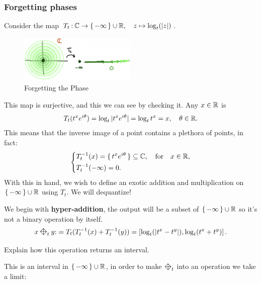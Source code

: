 \documentclass[12pt]{memoir}
\newcommand{\diamondplus}{\mathbin{\rotatebox[origin=c]{45}{$\boxtimes$}}} %
\begin{document}
\subsubsection{Forgetting phases}

Consider the map $T_t\mathbin{:}\mathbb{C}\to\{\,-\infty\,\}\cup\mathbb{R},\quad z\mapsto\log_t(|z|)$.
\begin{figure}[h!]
    \centering
    \includegraphics[width=0.5\textwidth]{figs/fig3-2-PhaseForgetting.png}
    \caption{Forgetting the Phase}
    \label{fig:3-2-PhaseForgetting}
\end{figure}
This map is surjective, and this we can see by checking it. Any $x\in\mathbb{R}$ is 
$$T_t(t^xe^{i\theta})=\log_t|t^xe^{i\theta}|=\log_tt^x=x,\quad\theta\in\mathbb{R}.$$
This means that the inverse image of a point contains a plethora of points, in fact:
$$
\left\lbrace
\begin{aligned}
    &T_t^{-1}(x)=\{\,t^xe^{i\theta}\,\}\subseteq\mathbb{C},\quad\text{for}\quad x\in\mathbb{R},\\
    &T_t^{-1}(-\infty)=0.
\end{aligned}
\right.
$$
With this in hand, we wish to define an exotic addition and multiplication on $\{\,-\infty\,\}\cup\mathbb{R}$ using $T_t$. We will dequantize!\par 
We begin with \textbf{hyper-addition}, the output will be a subset of $\{\,-\infty\,\}\cup\mathbb{R}$ so it's not a binary operation by itself. 
$$x\diamondplus_t y\:= T_t(T_t^{-1}(x)+T_t^{-1}(y))=\bonj{\log_t(|t^x-t^y|),\log_t(t^x+t^y)}.\label{problem1-hyperAddition}$$
\begin{Ej}[5]
Explain how this operation returns an interval.
\end{Ej}
This is an interval in $\{\,-\infty\,\}\cup\mathbb{R}$, in order to make $\diamondplus_t$ into an operation we take a limit:
\end{document}
